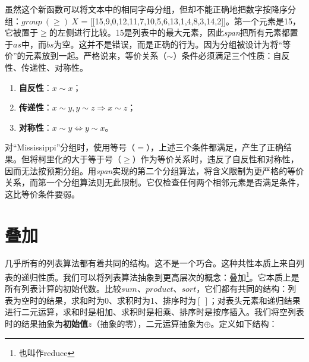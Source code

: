 \documentclass[b5paper]{ctexart}
\begin{document}
虽然这个新函数可以将文本中的相同字母分组，但却不能正确地把数字按降序分组：$\textit{group}\ (\geq)\ X$ = [[15,9,0,12,11,7,10,5,6,13,1,4,8,3,14,2]]。第一个元素是15，它被置于$\geq$的左侧进行比较。15是列表中的最大元素，因此\textit{span}把所有元素都置于$as$中，而$bs$为空。这并不是错误，而是正确的行为。因为分组被设计为将“等价”的元素放到一起。严格说来，等价关系（$\sim$）条件必须满足三个性质：自反性、传递性、对称性。

\begin{enumerate}
\item \textbf{自反性}：$x \sim x$；
\item \textbf{传递性}：$x \sim y, y \sim z \Rightarrow x \sim z$；
\item \textbf{对称性}：$x \sim y \Leftrightarrow y \sim x$。
\end{enumerate}

对``Mississippi''分组时，使用等号（$=$），上述三个条件都满足，产生了正确结果。但将柯里化的大于等于号（$\geq$）作为等价关系时，违反了自反性和对称性，因而无法按预期分组。用\textit{span}实现的第二个分组算法，将含义限制为更严格的等价关系，而第一个分组算法则无此限制。它仅检查任何两个相邻元素是否满足条件，这比等价条件要弱。

\begin{Exercise}
\end{Exercise}

\section{叠加}
\label{sec:fold}
  
几乎所有的列表算法都有着共同的结构。这不是一个巧合。这种共性本质上来自列表的递归性质。我们可以将列表算法抽象到更高层次的概念：叠加\footnote{也叫作reduce}。它本质上是所有列表计算的初始代数\cite{unplugged}。比较$sum$、$product$、$sort$，它们都有共同的结构：列表为空时的结果，求和时为0、求积时为1、排序时为$[\ ]$；对表头元素和递归结果进行二元运算，求和时是相加、求积时是相乘、排序时是按序插入。我们将空列表时的结果抽象为\textbf{初始值}$z$（抽象的零），二元运算抽象为$\oplus$。定义如下结构：
\end{document}
